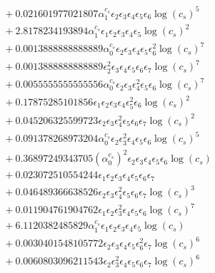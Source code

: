 \documentclass[10pt]{article}
\begin{document}
\begin{align*}
&{}  + 0.021601977021807 \alpha_{1}^{c_s} \epsilon_{2} \epsilon_{3} \epsilon_{4} \epsilon_{5} \epsilon_{6} \log{\left(c_{s} \right)}^{5} \\
&{}  + 2.8178234193894 \alpha_{1}^{c_s} \epsilon_{1} \epsilon_{2} \epsilon_{3} \epsilon_{4} \epsilon_{5} \log{\left(c_{s} \right)}^{2} \\
&{}  + 0.0013888888888889 \alpha_{0}^{c_s} \epsilon_{2} \epsilon_{3} \epsilon_{4} \epsilon_{5} \epsilon_{6}^{2} \log{\left(c_{s} \right)}^{7} \\
&{}  + 0.0013888888888889 \epsilon_{2}^{2} \epsilon_{3} \epsilon_{4} \epsilon_{5} \epsilon_{6} \epsilon_{7} \log{\left(c_{s} \right)}^{7} \\
&{}  + 0.0055555555555556 \alpha_{0}^{c_s} \epsilon_{2} \epsilon_{3} \epsilon_{4}^{2} \epsilon_{5} \epsilon_{6} \log{\left(c_{s} \right)}^{7} \\
&{}  + 0.17875285101856 \epsilon_{1} \epsilon_{2} \epsilon_{3} \epsilon_{4} \epsilon_{5}^{2} \epsilon_{6} \log{\left(c_{s} \right)}^{2} \\
&{}  + 0.045206325599723 \epsilon_{2} \epsilon_{3} \epsilon_{4}^{2} \epsilon_{5} \epsilon_{6} \epsilon_{7} \log{\left(c_{s} \right)}^{2} \\
&{}  + 0.091378268973204 \alpha_{0}^{c_s} \epsilon_{2} \epsilon_{3}^{2} \epsilon_{4} \epsilon_{5} \epsilon_{6} \log{\left(c_{s} \right)}^{5} \\
&{}  + 0.36897249343705 \left(\alpha_{0}^{c_s}\right)^{2} \epsilon_{2} \epsilon_{3} \epsilon_{4} \epsilon_{5} \epsilon_{6} \log{\left(c_{s} \right)} \\
&{}  + 0.023072510554244 \epsilon_{1} \epsilon_{2} \epsilon_{3} \epsilon_{4} \epsilon_{5} \epsilon_{6} \epsilon_{7} \\
&{}  + 0.046489366638526 \epsilon_{2} \epsilon_{3} \epsilon_{4}^{2} \epsilon_{5} \epsilon_{6} \epsilon_{7} \log{\left(c_{s} \right)}^{3} \\
&{}  + 0.011904761904762 \epsilon_{1} \epsilon_{2} \epsilon_{3}^{2} \epsilon_{4} \epsilon_{5} \epsilon_{6} \log{\left(c_{s} \right)}^{7} \\
&{}  + 6.1120382485829 \alpha_{1}^{c_s} \epsilon_{1} \epsilon_{2} \epsilon_{3} \epsilon_{4} \epsilon_{5} \log{\left(c_{s} \right)} \\
&{}  + 0.0030401548105772 \epsilon_{2} \epsilon_{3} \epsilon_{4} \epsilon_{5} \epsilon_{6}^{2} \epsilon_{7} \log{\left(c_{s} \right)}^{6} \\
&{}  + 0.0060803096211543 \epsilon_{2} \epsilon_{3}^{2} \epsilon_{4} \epsilon_{5} \epsilon_{6} \epsilon_{7} \log{\left(c_{s} \right)}^{6} \\

\end{align*}
\end{document}
